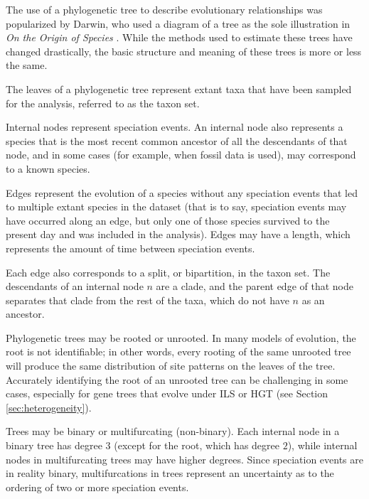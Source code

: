 \documentclass[edeposit,fullpage]{uiucthesis2014}
\theoremstyle{definition}
\begin{document}
The use of a phylogenetic tree to describe evolutionary relationships was popularized by Darwin, who used a diagram of a tree as the sole illustration in \emph{On the Origin of Species} \cite{darwin1859origin}. While the methods used to estimate these trees have changed drastically, the basic structure and meaning of these trees is more or less the same.

The leaves of a phylogenetic tree represent extant taxa that have been sampled for the analysis, referred to as the taxon set. 

Internal nodes represent speciation events. An internal node also represents a species that is the most recent common ancestor of all the descendants of that node, and in some cases (for example, when fossil data is used), may correspond to a known species.

Edges represent the evolution of a species without any speciation events that led to multiple extant species in the dataset (that is to say, speciation events may have occurred along an edge, but only one of those species survived to the present day and was included in the analysis). Edges may have a length, which represents the amount of time between speciation events. 


Each edge also corresponds to a split, or bipartition, in the taxon set. The descendants of an internal node $n$ are a clade, and the parent edge of that node separates that clade from the rest of the taxa, which do not have $n$ as an ancestor. 



Phylogenetic trees may be rooted or unrooted. In many models of evolution, the root is not identifiable; in other words, every rooting of the same unrooted tree will produce the same distribution of site patterns on the leaves of the tree. Accurately identifying the root of an unrooted tree can be challenging in some cases, especially for gene trees that evolve under ILS or HGT (see Section \ref{sec:heterogeneity}). 

Trees may be binary or multifurcating (non-binary). Each internal node in a binary tree has degree $3$ (except for the root, which has degree $2$), while internal nodes in multifurcating trees may have higher degrees. Since speciation events are in reality binary, multifurcations in trees represent an uncertainty as to the ordering of two or more speciation events.
\end{document}
